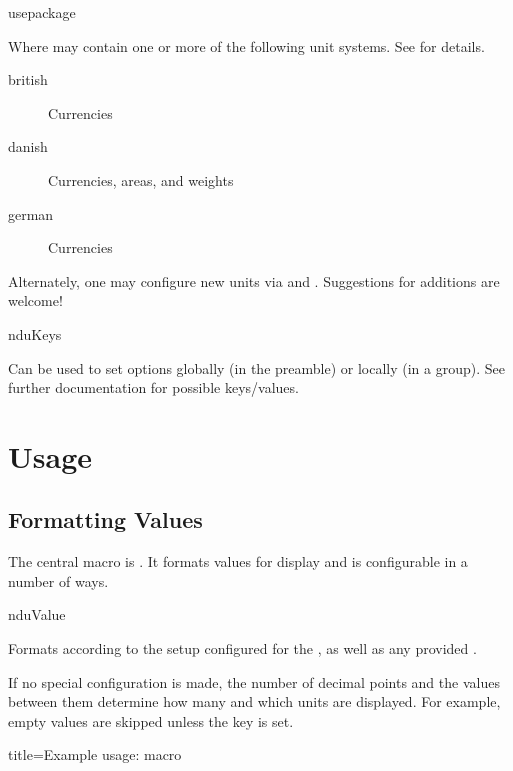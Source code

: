 \documentclass[
	a4paper,
]{article}
\begin{document}
\begin{docCommand}
	{usepackage}
	{}

Where  may contain one or more of the following unit systems. See  for details.

\begin{description}
\item[british] Currencies
\item[danish] Currencies, areas, and weights
\item[german] Currencies
\end{description}

Alternately, one may configure new units via  and . Suggestions for additions are welcome!

\end{docCommand}

\begin{docCommand}
	{nduKeys}
	{}

	Can be used to set options globally (in the preamble) or locally (in a group). See further documentation for possible keys/values.

\end{docCommand}

\clearpage
\section{Usage} %

\subsection{Formatting Values} %

The central macro is . It formats values for display and is configurable in a number of ways.

\begin{docCommand}
	{nduValue}
	{}

Formats  according to the setup configured for the , as well as any provided .

If no special configuration is made, the number of decimal points and the values between them determine how many and which units are displayed. For example, empty values are skipped unless the  key is set.
	
\begin{dispExample*}{
	title=Example usage:  macro
}
\\
\\
\\
\\
\end{dispExample*}
\end{docCommand}
\end{document}
